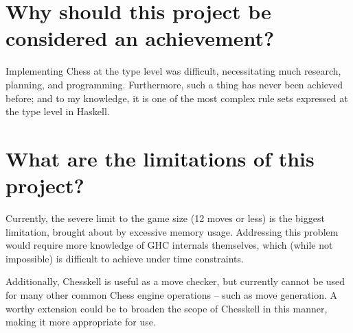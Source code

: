 \section{Why should this project be considered an achievement?}

Implementing Chess at the type level was difficult, necessitating much research, planning, and programming. Furthermore, such a thing has never been achieved before; and to my knowledge, it is one of the most complex rule sets expressed at the type level in Haskell.

\section{What are the limitations of this project?}

Currently, the severe limit to the game size (12 moves or less) is the biggest limitation, brought about by excessive memory usage. Addressing this problem would require more knowledge of GHC internals themselves, which (while not impossible) is difficult to achieve under time constraints.

Additionally, Chesskell is useful as a move checker, but currently cannot be used for many other common Chess engine operations -- such as move generation. A worthy extension could be to broaden the scope of Chesskell in this manner, making it more appropriate for use.

